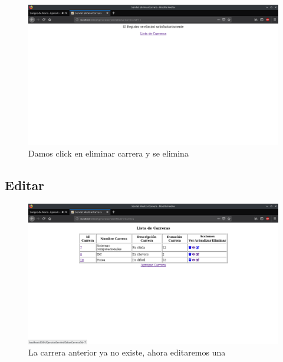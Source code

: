 \documentclass[a4paper,12pt]{article}
\begin{document}
\begin{figure}[H]
\begin{center}
 \includegraphics[width=\textwidth]{img/ver3.png}
 \caption{Damos click en eliminar carrera y se elimina}
 \label{fig:ver3}
\end{center}
\end{figure}

\subsection{Editar}

\begin{figure}[H]
\begin{center}
 \includegraphics[width=\textwidth]{img/editar1.png}
 \caption{La carrera anterior ya no existe, ahora editaremos una}
 \label{fig:editar1}
\end{center}
\end{figure}
\end{document}
